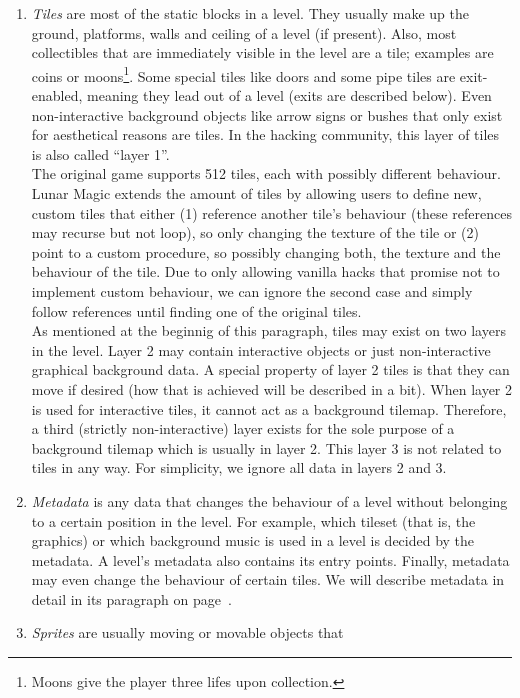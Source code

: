 \begin{enumerate}
\item \emph{Tiles} are most of the static blocks in a level. They
  usually make up the ground, platforms, walls and ceiling of a level
  (if present). Also, most collectibles that are immediately visible
  in the level are a tile; examples are coins or moons\footnote{Moons
    give the player three lifes upon collection.}. Some special tiles
  like doors and some pipe tiles are exit-enabled, meaning they lead
  out of a level (exits are described below). Even non-interactive
  background objects like arrow signs or bushes that only exist for
  aesthetical reasons are tiles. In the hacking community, this layer
  of tiles is also called ``layer 1''. \\
  The original game supports 512 tiles, each with possibly different
  behaviour. Lunar Magic extends the amount of tiles by allowing users
  to define new, custom tiles that either (1) reference another tile's
  behaviour (these references may recurse but not loop), so only
  changing the texture of the tile or (2) point to a custom procedure,
  so possibly changing both, the texture and the behaviour of the
  tile. Due to only allowing vanilla hacks that promise not to
  implement custom behaviour, we can ignore the second case and simply
  follow references until finding one of the original tiles. \\
  As mentioned at the beginnig of this paragraph, tiles may exist on
  two layers in the level. Layer 2 may contain interactive objects or
  just non-interactive graphical background data. A special property
  of layer 2 tiles is that they can move if desired (how that is
  achieved will be described in a bit). When layer 2 is used for
  interactive tiles, it cannot act as a background tilemap. Therefore,
  a third (strictly non-interactive) layer exists for the sole purpose
  of a background tilemap which is usually in layer 2. This layer 3 is
  not related to tiles in any way. For simplicity, we ignore all data
  in layers 2 and 3.
\item \emph{Metadata} is any data that changes the behaviour of a
  level without belonging to a certain position in the level. For
  example, which tileset (that is, the graphics) or which background
  music is used in a level is decided by the metadata. A level's
  metadata also contains its entry points. Finally, metadata may even
  change the behaviour of certain tiles. We will describe metadata in
  detail in its paragraph on page~\pageref{par:metadata}.
\item \emph{Sprites} are usually moving or movable objects that

\end{enumerate}

